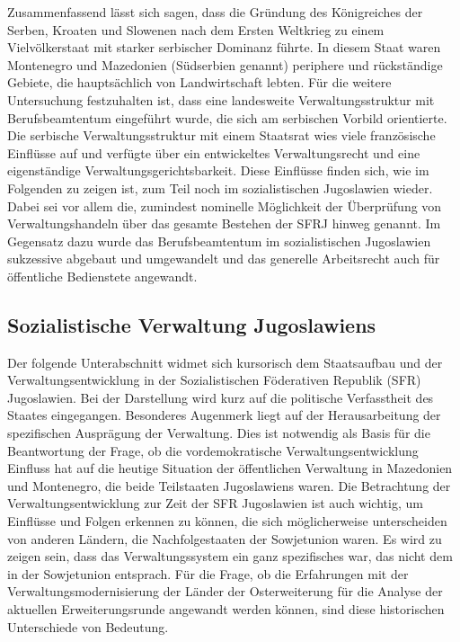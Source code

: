 Zusammenfassend lässt sich sagen, dass die Gründung des Königreiches der Serben, Kroaten und Slowenen nach dem Ersten Weltkrieg zu einem Vielvölkerstaat mit starker serbischer Dominanz führte. In diesem Staat waren Montenegro und Mazedonien (Südserbien genannt) periphere und rückständige Gebiete, die hauptsächlich von Landwirtschaft lebten. Für die weitere Untersuchung festzuhalten ist, dass eine landesweite Verwaltungsstruktur mit Berufsbeamtentum eingeführt wurde, die sich am serbischen Vorbild orientierte. Die serbische Verwaltungsstruktur mit einem Staatsrat wies viele französische Einflüsse auf und verfügte über ein entwickeltes Verwaltungsrecht und eine eigenständige Verwaltungsgerichtsbarkeit. Diese Einflüsse finden sich, wie im Folgenden zu zeigen ist, zum Teil noch im sozialistischen Jugoslawien wieder. Dabei sei vor allem die, zumindest nominelle Möglichkeit der Überprüfung von Verwaltungshandeln über das gesamte Bestehen der SFRJ hinweg genannt. Im Gegensatz dazu wurde das Berufsbeamtentum im sozialistischen Jugoslawien sukzessive abgebaut und umgewandelt und das generelle Arbeitsrecht auch für öffentliche Bedienstete angewandt.


\subsection{Sozialistische Verwaltung Jugoslawiens}
Der folgende Unterabschnitt widmet sich kursorisch dem Staatsaufbau und der Verwaltungsentwicklung in der Sozialistischen Föderativen Republik (SFR) Jugoslawien. Bei der Darstellung wird kurz auf die politische Verfasstheit des Staates eingegangen. Besonderes Augenmerk liegt auf der Herausarbeitung der spezifischen Ausprägung der Verwaltung. Dies ist notwendig als Basis für die Beantwortung der Frage, ob die vordemokratische Verwaltungsentwicklung Einfluss hat auf die heutige Situation der öffentlichen Verwaltung in Mazedonien und Montenegro, die beide Teilstaaten Jugoslawiens waren. Die Betrachtung der Verwaltungsentwicklung zur Zeit der SFR Jugoslawien ist auch wichtig, um Einflüsse und Folgen erkennen zu können, die sich möglicherweise unterscheiden von anderen Ländern, die Nachfolgestaaten der Sowjetunion waren. Es wird zu zeigen sein, dass das Verwaltungssystem ein ganz spezifisches war, das nicht dem in der Sowjetunion entsprach. Für die Frage, ob die Erfahrungen mit der Verwaltungsmodernisierung der Länder der Osterweiterung für die Analyse der aktuellen Erweiterungsrunde angewandt werden können, sind diese historischen Unterschiede von Bedeutung.

